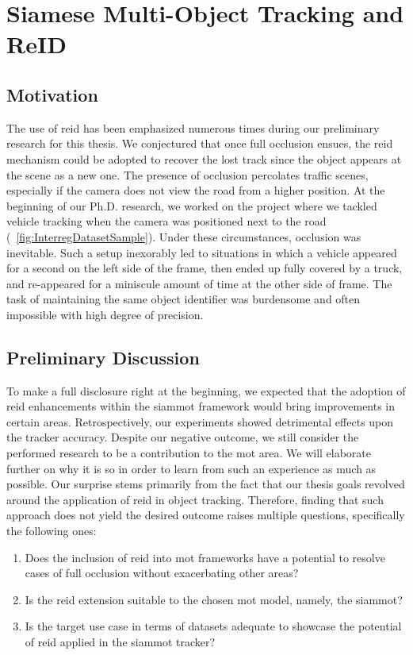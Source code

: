 \section{Siamese Multi-Object Tracking and ReID}
\label{sec:SiamMOTandReID}

\subsection{Motivation}

The use of \gls{reid} has been emphasized numerous times during our preliminary research for this thesis. We conjectured that once full occlusion ensues, the \gls{reid} mechanism could be adopted to recover the lost track since the object appears at the scene as a new one. The presence of occlusion percolates traffic scenes, especially if the camera does not view the road from a higher position. At the beginning of our Ph.D. research, we worked on the \interreg{} project where we tackled vehicle tracking when the camera was positioned next to the road (\figtext{}~\ref{fig:InterregDatasetSample}). Under these circumstances, occlusion was inevitable. Such a setup inexorably led to situations in which a vehicle appeared for a second on the left side of the frame, then ended up fully covered by a truck, and re-appeared for a miniscule amount of time at the other side of frame. The task of maintaining the same object identifier was burdensome and often impossible with high degree of precision.

\subsection{Preliminary Discussion}

To make a full disclosure right at the beginning, we expected that the adoption of \gls{reid} enhancements within the \gls{siammot} framework would bring improvements in certain areas. Retrospectively, our experiments showed detrimental effects upon the tracker accuracy. Despite our negative outcome, we still consider the performed research to be a contribution to the \gls{mot} area. We will elaborate further on why it is so in order to learn from such an experience as much as possible. Our surprise stems primarily from the fact that our thesis goals revolved around the application of \gls{reid} in object tracking. Therefore, finding that such approach does not yield the desired outcome raises multiple questions, specifically the following ones:
\begin{enumerate}
    \item Does the inclusion of \gls{reid} into \gls{mot} frameworks have a potential to resolve cases of full occlusion without exacerbating other areas?
    \item Is the \gls{reid} extension suitable to the chosen \gls{mot} model, namely, the \gls{siammot}?
    \item Is the target use case in terms of datasets adequate to showcase the potential of \gls{reid} applied in the \gls{siammot} tracker?
\end{enumerate}


